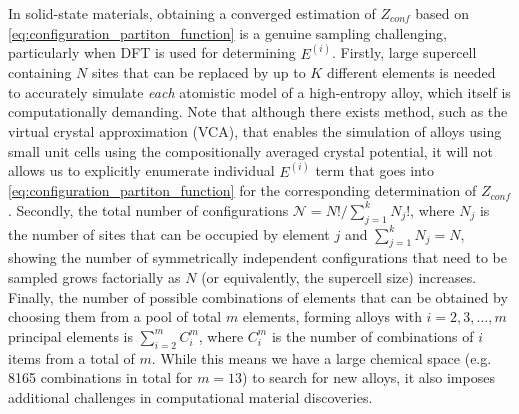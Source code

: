 In solid-state materials, obtaining a converged estimation of $Z_{conf}$ based on \cref{eq:configuration_partiton_function} is a genuine sampling challenging, particularly when DFT is used for determining $E^{(i)}$. Firstly,  large supercell containing $N$ sites that can be replaced by up to $K$ different elements is needed to accurately simulate \emph{each} atomistic model of a high-entropy alloy, which itself is computationally demanding. Note that although there exists method, such as the virtual crystal approximation (VCA),\cite{bellaiche2000virtual} that enables the simulation of alloys using small unit cells using the compositionally averaged crystal potential, it will not allows us to explicitly enumerate individual $E^{(i)}$ term that goes into \cref{eq:configuration_partiton_function} for the corresponding determination of $Z_{conf}$. Secondly, the total number of configurations $\mathcal{N}=N!/\sum_{j=1}^k N_j!$,\cite{he2017formation} where $N_j$ is the number of sites that can be occupied by element $j$ and $\sum_{j=1}^k N_j=N$, showing the number of symmetrically independent configurations that need to be sampled grows factorially as $N$ (or equivalently, the supercell size) increases. Finally, the number of possible combinations of elements that can be obtained by choosing them from a pool of total $m$ elements, forming alloys with $i=2,3,\dots, m$ principal elements is $\sum_{i=2}^{m} C_{i}^{m}$, where $C_{i}^{m}$ is the number of combinations of $i$ items from a total of $m$. While this means we have a large chemical space (e.g. 8165 combinations in total for $m=13$) to search for new alloys, it also imposes additional challenges in computational material discoveries.


